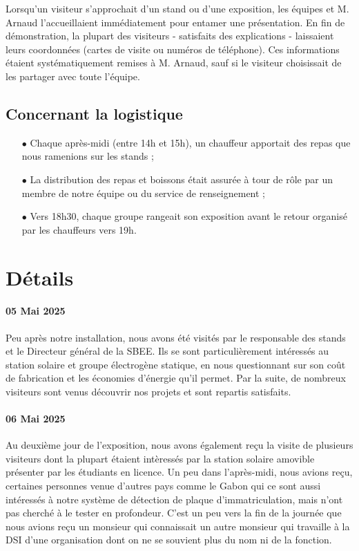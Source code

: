 \documentclass[12pt, a4paper]{article}
\begin{document}
Lorsqu'un visiteur s'approchait d'un stand ou d'une exposition, les équipes et M. Arnaud l'accueillaient immédiatement pour entamer une présentation. En fin de démonstration, la plupart des visiteurs - satisfaits des explications - laissaient leurs coordonnées (cartes de visite ou numéros de téléphone). Ces informations étaient systématiquement remises à M. Arnaud, sauf si le visiteur choisissait de les partager avec toute l'équipe.

\subsection{Concernant la logistique}

\begin{itemize}
	\item[$\bullet$] Chaque après-midi (entre 14h et 15h), un chauffeur apportait des repas que nous ramenions sur les stands ;
	\item[$\bullet$] La distribution des repas et boissons était assurée à tour de rôle par un membre de notre équipe ou du service de renseignement ;
	\item[$\bullet$] Vers 18h30, chaque groupe rangeait son exposition avant le retour organisé par les chauffeurs vers 19h.
\end{itemize}

\section{Détails}
\label{sec:details}
\paragraph{05 Mai 2025}
Peu après notre installation, nous avons été visités par le responsable des stands et le Directeur général de la SBEE. Ils se sont particulièrement intéressés au station solaire et groupe électrogène statique, en nous questionnant sur son coût de fabrication et les économies d'énergie qu'il permet. Par la suite, de nombreux visiteurs sont venus découvrir nos projets et sont repartis satisfaits.

\paragraph{06 Mai 2025}
Au deuxième jour de l’exposition, nous avons également reçu la visite de plusieurs visiteurs dont la plupart étaient intèressés par la station solaire amovible présenter par les étudiants en licence. Un peu dans l'après-midi, nous avions reçu, certaines personnes venue d'autres pays comme le Gabon qui ce sont aussi intéressés à notre système de détection de plaque d'immatriculation, mais n'ont pas cherché à le tester en profondeur. C'est un peu vers la fin de la journée que nous avions reçu un monsieur qui connaissait un autre monsieur qui travaille à la DSI d'une organisation dont on ne se souvient plus du nom ni de la fonction.
\end{document}

